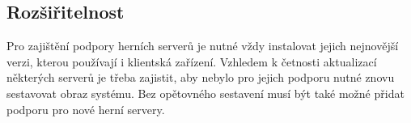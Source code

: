 \subsection{Rozšiřitelnost}

Pro zajištění podpory herních serverů je nutné vždy instalovat jejich nejnovější verzi, kterou používají i klientská zařízení.
Vzhledem k četnosti aktualizací některých serverů je třeba zajistit, aby nebylo pro jejich podporu nutné znovu sestavovat obraz systému.
Bez opětovného sestavení musí být také možné přidat podporu pro nové herní servery. 





